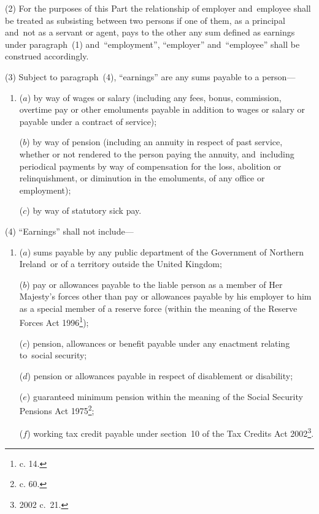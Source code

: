 \documentclass[12pt,a4paper]{article}
\begin{document}
(2) For the purposes of this Part the relationship of employer and~employee shall be treated as subsisting between two persons if one of them, as a principal and~not as a servant or agent, pays to the other any sum defined as earnings under paragraph~(1) and~“employment”, “employer” and~“employee” shall be construed accordingly.

(3) Subject to paragraph~(4), “earnings” are any sums payable to a person—
\begin{enumerate}\item[]
($a$) by way of wages or salary (including any fees, bonus, commission, overtime pay or other emoluments payable in addition to wages or salary or payable under a contract of service);

($b$) by way of pension (including an annuity in respect of past service, whether or not rendered to the person paying the annuity, and~including periodical payments by way of compensation for the loss, abolition or relinquishment, or diminution in the emoluments, of any office or employment);

($c$) by way of statutory sick pay.
\end{enumerate}

(4) “Earnings” shall not include—
\begin{enumerate}\item[]
($a$) sums payable by any public department of the Government of Northern Ireland~or of a territory outside the United Kingdom;

($b$) pay or allowances payable to the liable person as a member of Her Majesty’s forces
other than pay or allowances payable by his employer to him as a special member of a reserve force (within the meaning of the Reserve Forces Act 1996\footnote{ c. 14.});  %

($c$) pension, allowances or benefit payable under any enactment relating to~social security;

($d$) pension or allowances payable in respect of disablement or disability;

($e$) guaranteed minimum pension within the meaning of the Social Security Pensions Act 1975\footnote{ c. 60.};

($f$) working tax credit payable under section~10 of the Tax Credits Act 2002\footnote{2002 c.\ 21.}.
\end{enumerate}
\end{document}
